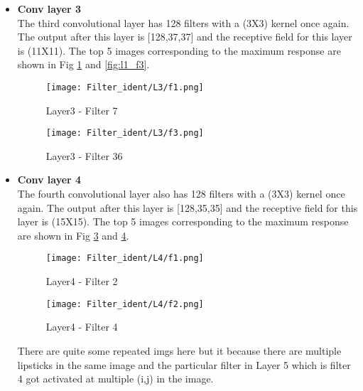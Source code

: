 \documentclass{article}
\begin{document}
\begin{itemize}
\item \textbf{Conv layer 3} \\
\noindent
The third convolutional layer has 128 filters with a (3X3) kernel once again. The output after this layer is [128,37,37] and the receptive field for this layer is (11X11). The top 5 images corresponding to the maximum response are shown in Fig \ref{fig:l3_f1} and \ref{fig:l1_f3}. 
\begin{figure}[H]
    \centering
    \texttt{[image: Filter\_ident/L3/f1.png]}
    \vspace{-1.0em}
    \caption{Layer3 - Filter 7}
    \label{fig:l3_f1}
\end{figure}
\begin{figure}[H]
    \centering
    \texttt{[image: Filter\_ident/L3/f3.png]}
    \vspace{-1.0em}
    \caption{Layer3 - Filter 36}
    \label{fig:l3_f3}
\end{figure}

\item \textbf{Conv layer 4} \\
\noindent
The fourth convolutional layer also has 128 filters with a (3X3) kernel once again. The output after this layer is [128,35,35] and the receptive field for this layer is (15X15). The top 5 images corresponding to the maximum response are shown in Fig \ref{fig:l4_f1} and \ref{fig:l4_f3}. 
\vspace{2.0em}
\begin{figure}[H]
    \centering
    \texttt{[image: Filter\_ident/L4/f1.png]}
    \vspace{-1.0em}
    \caption{Layer4 - Filter 2}
    \label{fig:l4_f1}
\end{figure}
\vspace{2.0em}
\begin{figure}[H]
    \centering
    \texttt{[image: Filter\_ident/L4/f2.png]}
    \vspace{-1.0em}
    \caption{Layer4 - Filter 4}
    \label{fig:l4_f3}
\end{figure}

There are quite some repeated imgs here but it because there are multiple lipsticks in the same image and the particular filter in Layer 5 which is filter 4 got activated at multiple (i,j) in the image.
\\


\end{itemize}
\end{document}
